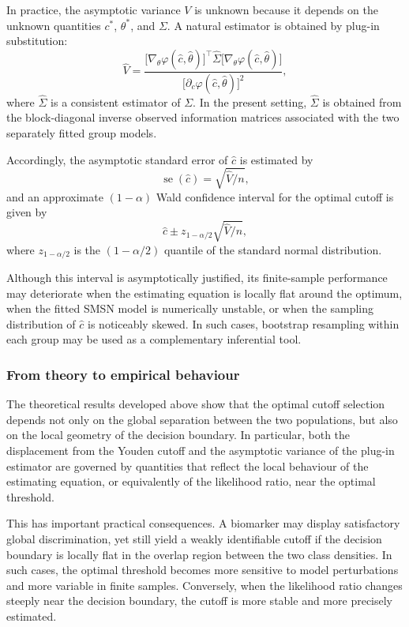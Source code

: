 \documentclass[11pt,a4paper]{article}
\theoremstyle{definition}
\theoremstyle{remark}
\newcommand{\1}{\mathbf{1}}
\begin{document}
In practice, the asymptotic variance $V$ is unknown because it depends on the unknown quantities $c^*$, $\theta^*$, and $\Sigma$. A natural estimator is obtained by plug-in substitution:
\begin{equation}
\label{eq:V-hat}
\hat V
=
\frac{
\bigl[\nabla_\theta\varphi(\hat c,\hat\theta)\bigr]^\top
\hat\Sigma
\bigl[\nabla_\theta\varphi(\hat c,\hat\theta)\bigr]
}{
\bigl[\partial_c\varphi(\hat c,\hat\theta)\bigr]^2
},
\end{equation}
where $\hat\Sigma$ is a consistent estimator of $\Sigma$. In the present setting, $\hat\Sigma$ is obtained from the block-diagonal inverse observed information matrices associated with the two separately fitted group models.

\noindent
Accordingly, the asymptotic standard error of $\hat c$ is estimated by
\[
\operatorname{se}(\hat c)=\sqrt{\hat V/n},
\]
and an approximate $(1-\alpha)$ Wald confidence interval for the optimal cutoff is given by
\begin{equation}
\label{eq:ci}
\hat c\pm z_{1-\alpha/2}\sqrt{\hat V/n},
\end{equation}
where $z_{1-\alpha/2}$ is the $(1-\alpha/2)$ quantile of the standard normal distribution.

Although this interval is asymptotically justified, its finite-sample performance may deteriorate when the estimating equation is locally flat around the optimum, when the fitted SMSN model is numerically unstable, or when the sampling distribution of $\hat c$ is noticeably skewed. In such cases, bootstrap resampling within each group may be used as a complementary inferential tool.

\subsubsection*{From theory to empirical behaviour}

The theoretical results developed above show that the optimal cutoff selection depends not only on the global separation between the two populations, but also on the local geometry of the decision boundary. In particular, both the displacement from the Youden cutoff and the asymptotic variance of the plug-in estimator are governed by quantities
that reflect the local behaviour of the estimating equation, or equivalently of the likelihood ratio, near the optimal threshold.

This has important practical consequences. A biomarker may display satisfactory global discrimination, yet still yield a weakly identifiable cutoff if the decision boundary is locally flat in the overlap region between the two class densities. In such cases, the optimal threshold becomes more sensitive to model perturbations and more variable in finite samples. Conversely, when the likelihood ratio changes steeply near the decision boundary, the cutoff is more stable and more precisely estimated.
\end{document}
